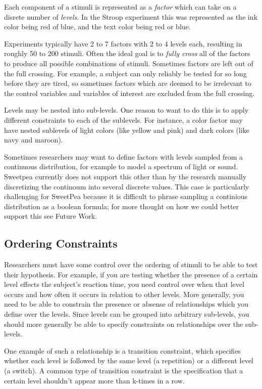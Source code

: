 Each component of a stimuli is represented as a \emph{factor} which can take on a disrete number of \emph{levels}. In the Stroop experiment this was represented as the ink color being red of blue, and the text color being red or blue.

Experiments typically have 2 to 7 factors with 2 to 4 levels each, resulting in roughly 50 to 200 stimuli. Often the ideal goal is to \emph{fully cross} all of the factors to produce all possible combinations of stimuli. Sometimes factors are left out of the full crossing. For example, a subject can only reliably be tested for so long before they are tired, so sometimes factors which are deemed to be irrelevant to the control variables and variables of interest are excluded from the full crossing.

Levels may be nested into sub-levels. One reason to want to do this is to apply different constraints to each of the sublevels. For instance, a color factor may have nested sublevels of light colors (like yellow and pink) and dark colors (like navy and maroon).

Sometimes researchers may want to define factors with levels sampled from a continuous distribution, for example to model a spectrum of light or sound. Sweetpea currently does not support this other than by the research manually discretizing the continoum into several discrete values. This case is particularly challenging for SweetPea because it is difficult to phrase sampling a continious distribution as a boolean formula; for more thought on how we could better support this see Future Work.

\subsection{Ordering Constraints}

Researchers must have some control over the ordering of stimuli to be able to test their hypothesis. For example, if you are testing whether the presence of a certain level effects the subject's reaction time, you need control over when that level occurs and how often it occurs in relation to other levels. More generally, you need to be able to constrain the presence or absense of relationships which you define over the levels. Since levels can be grouped into arbitrary sub-levels, you should more generally be able to specify constraints on relationships over the sub-levels.

One example of such a relationship is a transition constraint, which specifies whether each level is followed by the same level (a repetition) or a different level (a switch). A common type of transition constraint is the specification that a certain level shouldn't appear more than k-times in a row.

